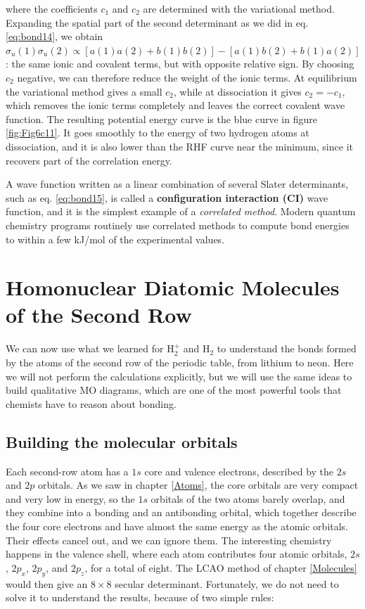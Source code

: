 \documentclass[
  english,
  9pt,
]{extbook}
\theoremstyle{definition}
\theoremstyle{definition}
\theoremstyle{definition}
\theoremstyle{definition}
\theoremstyle{remark}
\begin{document}
where the coefficients \(c_1\) and \(c_2\) are determined with the variational method. Expanding the spatial part of the second determinant as we did in eq. \eqref{eq:bond14}, we obtain \(\sigma_u(1)\sigma_u(2)\propto\left[a(1)a(2)+b(1)b(2)\right]-\left[a(1)b(2)+b(1)a(2)\right]\): the same ionic and covalent terms, but with opposite relative sign. By choosing \(c_2\) negative, we can therefore reduce the weight of the ionic terms. At equilibrium the variational method gives a small \(c_2\), while at dissociation it gives \(c_2=-c_1\), which removes the ionic terms completely and leaves the correct covalent wave function. The resulting potential energy curve is the blue curve in figure \ref{fig:Fig6c11}. It goes smoothly to the energy of two hydrogen atoms at dissociation, and it is also lower than the RHF curve near the minimum, since it recovers part of the correlation energy.

A wave function written as a linear combination of several Slater determinants, such as eq. \eqref{eq:bond15}, is called a \textbf{configuration interaction (CI)} wave function, and it is the simplest example of a \emph{correlated method}. Modern quantum chemistry programs routinely use correlated methods to compute bond energies to within a few kJ/mol of the experimental values.

\section{Homonuclear Diatomic Molecules of the Second Row}\label{homonuclear-diatomic-molecules-of-the-second-row}

We can now use what we learned for \(\mathrm{H}_2^+\) and \(\mathrm{H}_2\) to understand the bonds formed by the atoms of the second row of the periodic table, from lithium to neon. Here we will not perform the calculations explicitly, but we will use the same ideas to build qualitative MO diagrams, which are one of the most powerful tools that chemists have to reason about bonding.

\subsection{Building the molecular orbitals}\label{building-the-molecular-orbitals}

Each second-row atom has a \(1s\) core and valence electrons, described by the \(2s\) and \(2p\) orbitals. As we saw in chapter \ref{Atoms}, the core orbitals are very compact and very low in energy, so the \(1s\) orbitals of the two atoms barely overlap, and they combine into a bonding and an antibonding orbital, which together describe the four core electrons and have almost the same energy as the atomic orbitals. Their effects cancel out, and we can ignore them. The interesting chemistry happens in the valence shell, where each atom contributes four atomic orbitals, \(2s\), \(2p_x\), \(2p_y\), and \(2p_z\), for a total of eight. The LCAO method of chapter \ref{Molecules} would then give an \(8\times8\) secular determinant. Fortunately, we do not need to solve it to understand the results, because of two simple rules:
\end{document}

